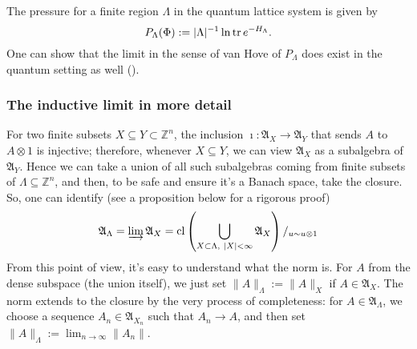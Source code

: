 The pressure for a finite region $\Lambda$ in the quantum lattice system is given by
\[
P_{\Lambda}(\Phi) := |\Lambda|^{-1} \ln \operatorname{tr} e^{-H_{\Lambda}}.
\]
One can show that the limit in the sense of van Hove of $P_{\Lambda}$ does exist in the quantum setting as well (\cite{israel}).

%
\subsubsection{The inductive limit in more detail}
For two finite subsets $X \subseteq Y \subset \mathbb Z^n$, the inclusion $\imath : \mathfrak A_{X} \rightarrow \mathfrak A_{Y}$ that sends $A$ to $A \otimes 1$ is injective; therefore, whenever $X \subseteq Y$, we can view $\mathfrak A_{X}$ as a subalgebra of $\mathfrak A_{Y}$. Hence we can take a union of all such subalgebras coming from finite subsets of $\Lambda \subseteq \mathbb Z^n$, and then, to be safe and ensure it's a Banach space, take the closure. So, one can identify (see a proposition below for a rigorous proof)
\[
\mathfrak A_{\Lambda} = \varinjlim \mathfrak A_{X} = \operatorname{cl} \left(\bigcup_{X \subset \Lambda, \ |X| < \infty} \mathfrak A_{X}\right)/_{u \sim u \otimes 1}
\]
From this point of view, it's easy to understand what the norm is. For $A$ from the dense subspace (the union itself), we just set $\|A\|_{\Lambda} := \|A\|_{X}$ if $A \in \mathfrak A_{X}$. The norm extends to the closure by the very process of completeness: for $A \in \mathfrak A_{\Lambda}$, we choose a sequence $A_n \in \mathfrak A_{X_n}$ such that $A_n \rightarrow A$, and then set $\|A\|_{\Lambda} := \lim_{n \rightarrow \infty} \|A_n\|$.

